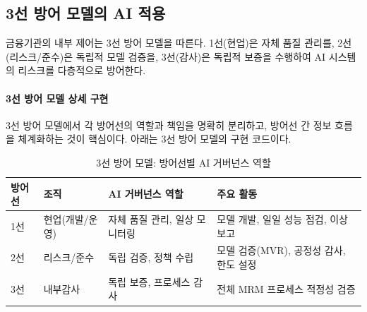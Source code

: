 \subsection{3선 방어 모델의 AI 적용}
\label{sec:17.3.2}

금융기관의 내부 제어는 3선 방어 모델을 따른다. 1선(현업)은 자체 품질 관리를, 2선(리스크/준수)은 독립적 모델 검증을, 3선(감사)은 독립적 보증을 수행하여 AI 시스템의 리스크를 다층적으로 방어한다.

\paragraph{3선 방어 모델 상세 구현}

3선 방어 모델에서 각 방어선의 역할과 책임을 명확히 분리하고, 방어선 간 정보 흐름을 체계화하는 것이 핵심이다. 아래는 3선 방어 모델의 구현 코드이다.

\begin{table}[htbp]
\centering
\caption{3선 방어 모델: 방어선별 AI 거버넌스 역할}
\label{tab:17_3lines}
\begin{tabularx}{\textwidth}{p{1.5cm}p{2.5cm}Xp{3.5cm}}
\toprule
\textbf{방어선} & \textbf{조직} & \textbf{AI 거버넌스 역할} & \textbf{주요 활동} \\
\midrule
1선 & 현업(개발/운영) & 자체 품질 관리, 일상 모니터링 & 모델 개발, 일일 성능 점검, 이상 보고 \\
2선 & 리스크/준수 & 독립 검증, 정책 수립 & 모델 검증(MVR), 공정성 감사, 한도 설정 \\
3선 & 내부감사 & 독립 보증, 프로세스 감사 & 전체 MRM 프로세스 적정성 검증 \\
\bottomrule
\end{tabularx}
\end{table}

